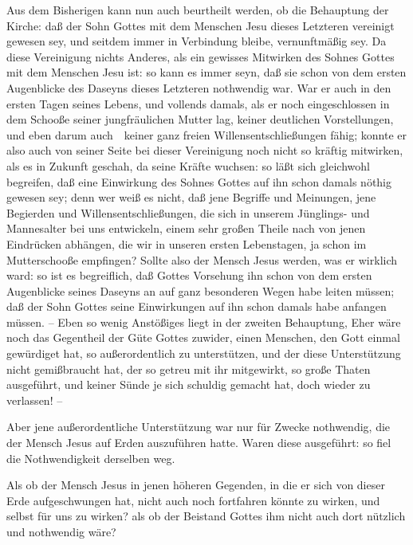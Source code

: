 \begin{aufza}
\item Aus dem Bisherigen kann nun auch beurtheilt werden, ob die Behauptung der Kirche: daß der Sohn Gottes mit dem Menschen Jesu  dieses Letzteren vereinigt gewesen sey, und seitdem immer in Verbindung bleibe, vernunftmäßig sey. Da diese Vereinigung nichts Anderes, als ein gewisses Mitwirken des Sohnes Gottes mit dem Menschen Jesu ist: so kann es immer seyn, daß sie schon von dem ersten Augenblicke des Daseyns dieses Letzteren nothwendig war. War er auch in den ersten Tagen seines Lebens, und vollends damals, als er noch eingeschlossen in dem Schooße seiner jungfräulichen Mutter lag, keiner deutlichen Vorstellungen, und eben darum auch~\ keiner ganz freien Willensentschließungen fähig; konnte er also auch von seiner Seite bei dieser Vereinigung noch nicht so kräftig mitwirken, als es in Zukunft geschah, da seine Kräfte wuchsen: so läßt sich gleichwohl begreifen, daß eine Einwirkung des Sohnes Gottes auf ihn schon damals nöthig gewesen sey; denn wer weiß es nicht, daß jene Begriffe und Meinungen, jene Begierden und Willensentschließungen, die sich in unserem Jünglings- und Mannesalter bei uns entwickeln, einem sehr großen Theile nach von jenen Eindrücken abhängen, die wir in unseren ersten Lebenstagen, ja schon im Mutterschooße empfingen? Sollte also der Mensch Jesus werden, was er wirklich ward: so ist es begreiflich, daß Gottes Vorsehung ihn schon von dem ersten Augenblicke seines Daseyns an auf ganz besonderen Wegen habe leiten müssen; daß der Sohn Gottes seine Einwirkungen auf ihn schon damals habe anfangen müssen. -- Eben so wenig Anstößiges liegt in der zweiten Behauptung,  Eher wäre noch das Gegentheil der Güte Gottes zuwider, einen Menschen, den Gott einmal gewürdiget hat, so außerordentlich zu unterstützen, und der diese Unterstützung nicht gemißbraucht hat, der so getreu mit ihr mitgewirkt, so große Thaten ausgeführt, und keiner Sünde je sich schuldig gemacht hat, doch wieder zu verlassen! --\par
{} Aber jene außerordentliche Unterstützung war nur für Zwecke nothwendig, die der Mensch Jesus auf Erden auszuführen hatte. Waren diese ausgeführt: so fiel die Nothwendigkeit derselben weg.\par
{} Als ob der Mensch Jesus in jenen höheren Gegenden, in die er sich von dieser Erde aufgeschwungen hat, nicht auch noch fortfahren könnte zu wirken, und selbst für uns zu wirken? als ob der Beistand Gottes ihm nicht auch dort nützlich und nothwendig wäre?\par

\end{aufza}
